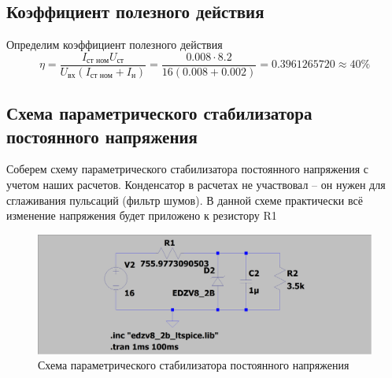 \documentclass[a4paper, 12pt]{article}
\begin{document}
    \subsection{Коэффициент полезного действия}
    Определим коэффициент полезного действия
    $$
    \eta=\dfrac{I_\text{ст ном}U_{\text{ст}}}{U_{\text{вх}}\left( I_{\text{ст ном}}+I_{\text{н}} \right)}=\dfrac{0.008\cdot8.2}{16\left( 0.008+0.002 \right)}=0.3961265720\approx40\%
    $$


    \subsection{Схема параметрического стабилизатора постоянного напряжения}
    Соберем схему параметрического стабилизатора постоянного напряжения с учетом наших расчетов.
    Конденсатор в расчетах не участвовал -- он нужен для сглаживания пульсаций (фильтр шумов).
    В данной схеме практически всё изменение напряжения будет приложено к резистору R1
    \begin{figure}[H]
        \centering
        \includegraphics[scale=0.22]{1task_scheme_AC.png}
        \captionsetup{skip=0pt}
        \caption{Схема параметрического стабилизатора постоянного напряжения}
        \label{fig:1task_scheme_AC}
    \end{figure}
\end{document}
